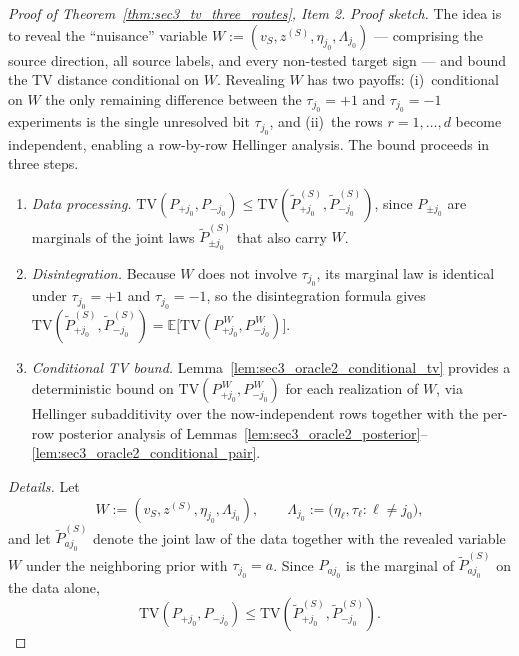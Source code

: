 \documentclass[10pt]{article}
\newcommand{\Ebb}{\mathbb E}
\newcommand{\TV}{\mathrm{TV}}
\newcommand{\src}{S}
\newcommand{\zsrc}{z^{(\src)}}
\begin{document}
\begin{proof}[Proof of Theorem~\ref{thm:sec3_tv_three_routes}, Item 2]
\textit{Proof sketch.}
The idea is to reveal the ``nuisance'' variable
$W:=(v_{\src},\zsrc,\eta_{j_0},\Lambda_{j_0})$ --- comprising the source direction,
all source labels, and every non-tested target sign --- and bound the TV
distance conditional on $W$. Revealing $W$ has two payoffs: (i)~conditional
on $W$ the only remaining difference between the $\tau_{j_0}=+1$ and $\tau_{j_0}=-1$
experiments is the single unresolved bit $\tau_{j_0}$, and (ii)~the rows
$r=1,\ldots,d$ become independent, enabling a row-by-row Hellinger analysis.
The bound proceeds in three steps.
\begin{enumerate}[label=(\roman*)]
\item \emph{Data processing.} $\TV(P_{+j_0},P_{-j_0})\le
      \TV(\widetilde P_{+j_0}^{(\src)},\widetilde P_{-j_0}^{(\src)})$,
      since $P_{\pm j_0}$ are marginals of the joint laws $\widetilde P_{\pm j_0}^{(\src)}$
      that also carry $W$.
\item \emph{Disintegration.} Because $W$ does not involve $\tau_{j_0}$, its
      marginal law is identical under $\tau_{j_0}=+1$ and $\tau_{j_0}=-1$, so the
      disintegration formula gives
      $\TV(\widetilde P_{+j_0}^{(\src)},\widetilde P_{-j_0}^{(\src)})
       =\Ebb\bigl[\TV(P_{+j_0}^{\,W},P_{-j_0}^{\,W})\bigr]$.
\item \emph{Conditional TV bound.}
      Lemma~\ref{lem:sec3_oracle2_conditional_tv} provides a deterministic
      bound on $\TV(P_{+j_0}^{\,W},P_{-j_0}^{\,W})$ for each realization of $W$,
      via Hellinger subadditivity over the now-independent rows together with
      the per-row posterior analysis of
      Lemmas~\ref{lem:sec3_oracle2_posterior}--\ref{lem:sec3_oracle2_conditional_pair}.
\end{enumerate}

\medskip
\noindent\textit{Details.}
Let
\[
    W:=(v_{\src},\zsrc,\eta_{j_0},\Lambda_{j_0}),
    \qquad
    \Lambda_{j_0}:=\bigl(\eta_\ell,\tau_\ell:\ell\neq j_0\bigr),
\]
and let $\widetilde P_{aj_0}^{(\src)}$ denote the joint law of the data together
with the revealed variable $W$ under the neighboring prior with $\tau_{j_0}=a$.
Since $P_{aj_0}$ is the marginal of $\widetilde P_{aj_0}^{(\src)}$ on the data
alone,
\[
    \TV(P_{+j_0},P_{-j_0})
    \le
    \TV(\widetilde P_{+j_0}^{(\src)},\widetilde P_{-j_0}^{(\src)}).
\]


\end{proof}
\end{document}
